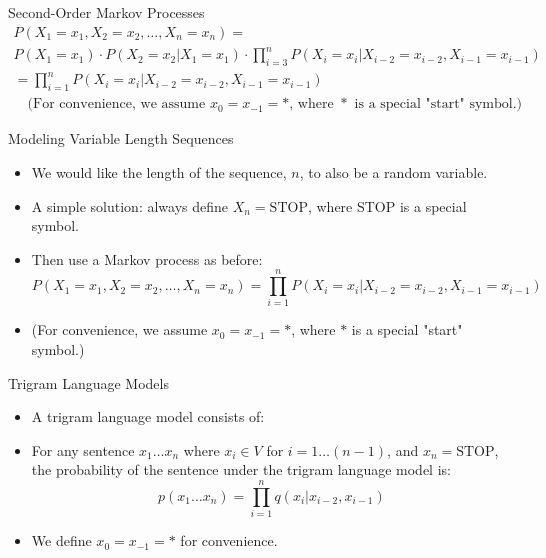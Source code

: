 \documentclass[handout]{beamer}
\begin{document}
\begin{frame}{Second-Order Markov Processes}
    \scriptsize
    \begin{align*}
        P(X_1 = x_1, X_2 = x_2, \ldots, X_n = x_n) = \\  P(X_1 = x_1) \cdot P(X_2 = x_2|X_1 = x_1) \cdot \prod_{i=3}^{n} P(X_i = x_i|X_{i-2} = x_{i-2}, X_{i-1} = x_{i-1}) \\
        = \prod_{i=1}^{n} P(X_i = x_i|X_{i-2} = x_{i-2}, X_{i-1} = x_{i-1}) \\
        \quad \text{(For convenience, we assume $x_0 = x_{-1} = *$, where $*$ is a special "start" symbol.)}
    \end{align*}
    
    
    
\end{frame}

\begin{frame}{Modeling Variable Length Sequences}
    \scriptsize
    \begin{itemize}
        \item We would like the length of the sequence, $n$, to also be a random variable.
        \item A simple solution: always define $X_n = \text{STOP}$, where STOP is a special symbol.
        \item Then use a Markov process as before:
        \[
            P(X_1 = x_1, X_2 = x_2, \ldots, X_n = x_n) = \prod_{i=1}^{n} P(X_i = x_i|X_{i-2} = x_{i-2}, X_{i-1} = x_{i-1})
        \]
        \item (For convenience, we assume $x_0 = x_{-1} = *$, where $*$ is a special "start" symbol.)
    \end{itemize}
\end{frame}

\begin{frame}{Trigram Language Models}
    \scriptsize
    \begin{itemize}
        \item A trigram language model consists of:
        \item For any sentence $x_1 \ldots x_n$ where $x_i \in V$ for $i = 1 \ldots (n-1)$, and $x_n = \text{STOP}$, the probability of the sentence under the trigram language model is:
        \[
            p(x_1 \ldots x_n) = \prod_{i=1}^{n} q(x_i|x_{i-2}, x_{i-1})
        \]
        \item We define $x_0 = x_{-1} = *$ for convenience.
    \end{itemize}
\end{frame}
\end{document}
